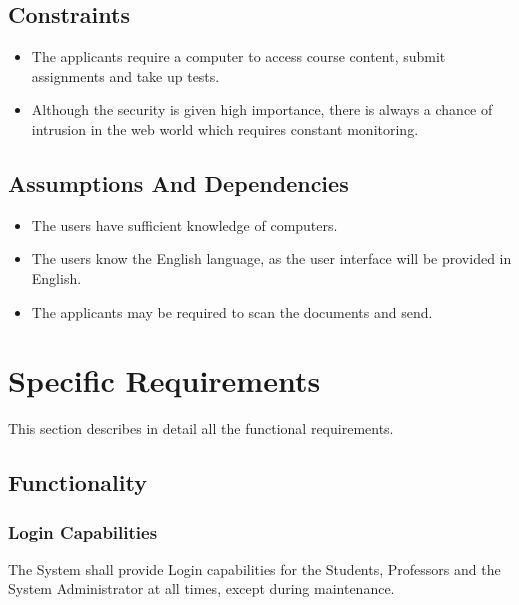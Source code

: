 \documentclass[12pt, a4]{report}
\begin{document}

\section{Constraints}
\begin{itemize}
    \item The applicants require a computer to access course content, submit assignments and take up tests.
    \item Although the security is given high importance, there is always a chance of intrusion in the web world which requires constant monitoring.
\end{itemize}


\section{Assumptions And Dependencies}
\begin{itemize}
    \item The users have sufficient knowledge of computers.
    \item The users know the English language, as the user interface will be provided in English.
    \item The applicants may be required to scan the documents and send.
\end{itemize}


\chapter{Specific Requirements}
This section describes in detail all the functional requirements.


\section{Functionality}

\subsection{Login Capabilities}
The System shall provide Login capabilities for the Students, Professors and the System Administrator at all times, except during maintenance.
\end{document}
